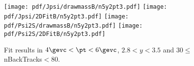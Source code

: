 \begin{figure}[H]
\begin{center}
\texttt{[image: pdf/Jpsi/drawmassB/n5y2pt3.pdf]}
\texttt{[image: pdf/Jpsi/2DFitB/n5y2pt3.pdf]}
\vspace*{-0.5cm}
\texttt{[image: pdf/Psi2S/drawmassB/n5y2pt3.pdf]}
\texttt{[image: pdf/Psi2S/2DFitB/n5y2pt3.pdf]}
\vspace*{-0.5cm}
\end{center}
\caption{Fit results in $4\gevc<\pt<6\gevc$, $2.8<y<3.5$ and 30$\leq$nBackTracks$<$80.}
\label{Fitn5y2pt3}
\end{figure}
